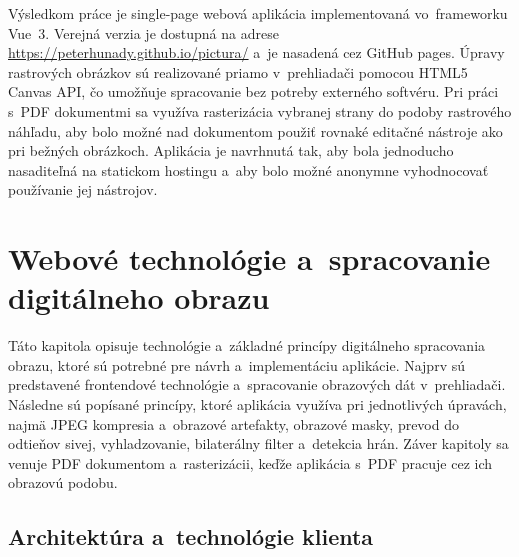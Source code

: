 Výsledkom práce je single-page webová aplikácia implementovaná vo~frameworku Vue~3. Verejná verzia je dostupná na adrese \url{https://peterhunady.github.io/pictura/} a~je nasadená cez GitHub pages. Úpravy rastrových obrázkov sú realizované priamo v~prehliadači pomocou HTML5 Canvas API, čo umožňuje spracovanie bez potreby externého softvéru. Pri práci s~PDF dokumentmi sa využíva rasterizácia vybranej strany do podoby rastrového náhľadu, aby bolo možné nad dokumentom použiť rovnaké editačné nástroje ako pri bežných obrázkoch. Aplikácia je navrhnutá tak, aby bola jednoducho nasaditeľná na statickom hostingu a~aby bolo možné anonymne vyhodnocovať používanie jej nástrojov.

\chapter{Webové technológie a~spracovanie digitálneho obrazu}
\label{chap_teoria}

Táto kapitola opisuje technológie a~základné princípy digitálneho spracovania obrazu, ktoré sú potrebné pre návrh a~implementáciu aplikácie. Najprv sú predstavené frontendové technológie a~spracovanie obrazových dát v~prehliadači. Následne sú popísané princípy, ktoré aplikácia využíva pri jednotlivých úpravách, najmä JPEG kompresia a~obrazové artefakty, obrazové masky, prevod do odtieňov sivej, vyhladzovanie, bilaterálny filter a~detekcia hrán. Záver kapitoly sa venuje PDF dokumentom a~rasterizácii, keďže aplikácia s~PDF pracuje cez ich obrazovú podobu.

\section{Architektúra a~technológie klienta}
\label{sec:frontend_technologies}

